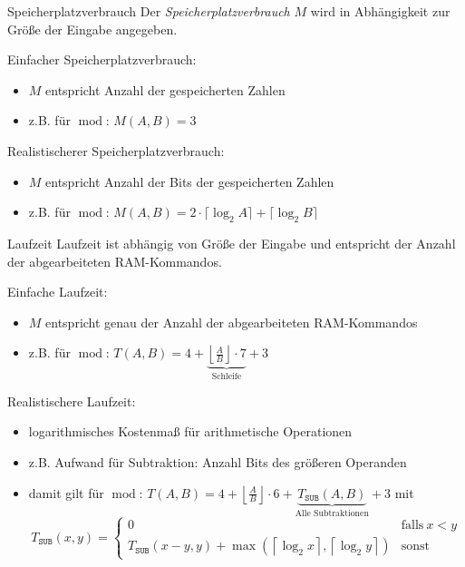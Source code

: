 \documentclass[german]{spicker}
\begin{document}
\begin{defi}{Speicherplatzverbrauch}
  Der \emph{Speicherplatzverbrauch} $M$ wird in Abhängigkeit zur Größe der Eingabe angegeben.

  Einfacher Speicherplatzverbrauch:
  \begin{itemize}
    \item $M$ entspricht Anzahl der gespeicherten Zahlen
    \item z.B. für $\operatorname{mod}$: $M(A, B) = 3$
  \end{itemize}

  Realistischerer Speicherplatzverbrauch:
  \begin{itemize}
    \item $M$ entspricht Anzahl der Bits der gespeicherten Zahlen
    \item z.B. für $\operatorname{mod}$: $M(A, B) = 2 \cdot \lceil \log_2 A \rceil + \lceil \log_2 B \rceil$
  \end{itemize}
\end{defi}

\begin{defi}{Laufzeit}
  Laufzeit ist abhängig von Größe der Eingabe und entspricht der Anzahl der abgearbeiteten RAM-Kommandos.

  Einfache Laufzeit:
  \begin{itemize}
    \item $M$ entspricht genau der Anzahl der abgearbeiteten RAM-Kommandos
    \item z.B. für $\operatorname{mod}$: $T(A, B) = 4 + \underbrace{\left\lfloor \frac{A}{B} \right\rfloor \cdot 7}_{\text{Schleife}} + 3$
  \end{itemize}

  Realistischere Laufzeit:
  \begin{itemize}
    \item logarithmisches Kostenmaß für arithmetische Operationen
    \item z.B. Aufwand für Subtraktion: Anzahl Bits des größeren Operanden
    \item damit gilt für $\operatorname{mod}$: $T(A, B) = 4 + \left\lfloor \frac{A}{B} \right\rfloor \cdot 6 + \underbrace{T_{\texttt{SUB}}(A, B)}_{\text{Alle Subtraktionen}} + 3$
          mit
          $$
            T_{\texttt{SUB}}(x, y) = \begin{cases}
              0                                                                                                      & \text{falls} \ x < y \\
              T_{\texttt{SUB}}(x-y, y) + \max (\left\lceil \log_2 x \right\rceil, \left\lceil \log_2 y \right\rceil) & \text{sonst}
            \end{cases}
          $$
  \end{itemize}
\end{defi}

\printindex
\printindex[Beispiele]

\printbibliography
\end{document}
